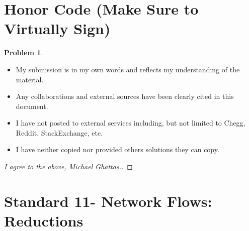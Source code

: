 \documentclass[11pt]{article}
\theoremstyle{definition}
\theoremstyle{definition}
\newtheorem{required}{Problem}
\theoremstyle{definition}
\begin{document}

\section{Honor Code (Make Sure to Virtually Sign)} \label{HonorCode}

\begin{required}
\begin{itemize}
\item My submission is in my own words and reflects my understanding of the material.
\item Any collaborations and external sources have been clearly cited in this document.
\item I have not posted to external services including, but not limited to Chegg, Reddit, StackExchange, etc.
\item I have neither copied nor provided others solutions they can copy.
\end{itemize}

\end{required}

\begin{proof}[I agree to the above, Michael Ghattas.]
\end{proof}




\newpage
\section{Standard 11- Network Flows: Reductions}
\end{document}
